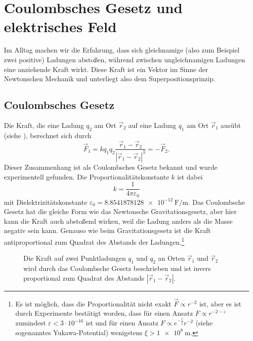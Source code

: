 \section{Coulombsches Gesetz und elektrisches Feld}

Im Alltag machen wir die Erfahrung, dass sich gleichnamige (also zum Beispiel zwei positive) Ladungen abstoßen, während zwischen ungleichnamigen Ladungen eine anziehende Kraft wirkt. Diese Kraft ist ein Vektor im Sinne der Newtonschen Mechanik und unterliegt also dem Superpositionsprinzip.


\subsection{Coulombsches Gesetz}

Die Kraft, die eine Ladung $q_{2}$ am Ort $\vec {r}_{2}$ auf eine Ladung $q_{1}$ am Ort $\vec {r}_{1}$ ausübt (siehe ), berechnet sich durch
\begin{equation}
	\label{3.1}
	\boxed{\vec {F}_{1}=kq_{1}q_{2}\frac{\vec {r}_{1}-\vec {r}_{2}}{\left| \vec {r}_{1}-\vec {r}_{2}\right| ^{3}}=-\vec {F}_{2}.}
\end{equation}
Dieser Zusammenhang ist als Coulombsches Gesetz bekannt und wurde experimentell gefunden. Die Proportionalitätskonstante $k$ ist dabei
\begin{equation*}
	k=\frac{1}{4\pi \varepsilon _{0}}
\end{equation*}
mit Dielektrizitätskonstante $\varepsilon _{0}=\SI{8,8541878128e-12}{\farad\per\m}$. Das Coulombsche Gesetz hat die gleiche Form wie das Newtonsche Gravitationsgesetz, aber hier kann die Kraft auch abstoßend wirken, weil die Ladung anders als die Masse negativ sein kann. Genauso wie beim Gravitationsgesetz ist die Kraft antiproportional zum Quadrat des Abstands der Ladungen.\footnote{Es ist möglich, dass die Proportionalität nicht exakt $\vec {F}\propto r^{-2}$ ist, aber es ist durch Experimente bestätigt worden, dass für einen Ansatz $F\propto r^{-2-\varepsilon }$ zumindest $\varepsilon <3\cdot 10^{-16}$ ist und für einen Ansatz $F\propto e^{-\frac{r}{\xi }}r^{-2}$ (siehe sogenanntes Yukawa-Potential) wenigstens $\xi >\SI{1e8}{\m}$. }

\begin{figure}[htb]
	\centering
	\tfigCoulombForceOnPointCharges
	\caption{Die Kraft auf zwei Punktladungen $q_1$ und $q_2$ an Orten $\vec r_1$ und $\vec r_2$ wird durch das Coulombsche Gesetz beschrieben und ist invers proportional zum Quadrat des Abstands $\left|\vec r_1-\vec r_2\right|$. }
	\label{fig:coulomb_point_charges}
\end{figure}


